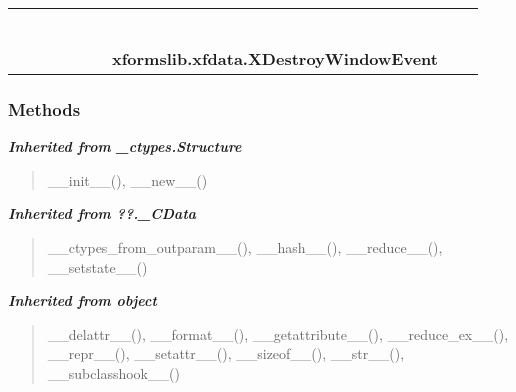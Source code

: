     \label{xformslib:xfdata:XDestroyWindowEvent}
\begin{tabular}{cccccccccc}
\multicolumn{2}{r}{\settowidth{\BCL}{object}\multirow{2}{\BCL}{object}}
&&
&&
&&
  \\\cline{3-3}
  &&\multicolumn{1}{c|}{}
&&
&&
&&
  \\
\multicolumn{4}{r}{\settowidth{\BCL}{??.\_CData}\multirow{2}{\BCL}{??.\_CData}}
&&
&&
  \\\cline{5-5}
  &&&&\multicolumn{1}{c|}{}
&&
&&
  \\
\multicolumn{6}{r}{\settowidth{\BCL}{\_ctypes.Structure}\multirow{2}{\BCL}{\_ctypes.Structure}}
&&
  \\\cline{7-7}
  &&&&&&\multicolumn{1}{c|}{}
&&
  \\
&&&&&&\multicolumn{2}{l}{\textbf{xformslib.xfdata.XDestroyWindowEvent}}
\end{tabular}



  \subsubsection{Methods}


\large{\textbf{\textit{Inherited from \_ctypes.Structure}}}

\begin{quote}
\_\_init\_\_(), \_\_new\_\_()
\end{quote}

\large{\textbf{\textit{Inherited from ??.\_CData}}}

\begin{quote}
\_\_ctypes\_from\_outparam\_\_(), \_\_hash\_\_(), \_\_reduce\_\_(), \_\_setstate\_\_()
\end{quote}

\large{\textbf{\textit{Inherited from object}}}

\begin{quote}
\_\_delattr\_\_(), \_\_format\_\_(), \_\_getattribute\_\_(), \_\_reduce\_ex\_\_(), \_\_repr\_\_(), \_\_setattr\_\_(), \_\_sizeof\_\_(), \_\_str\_\_(), \_\_subclasshook\_\_()
\end{quote}

